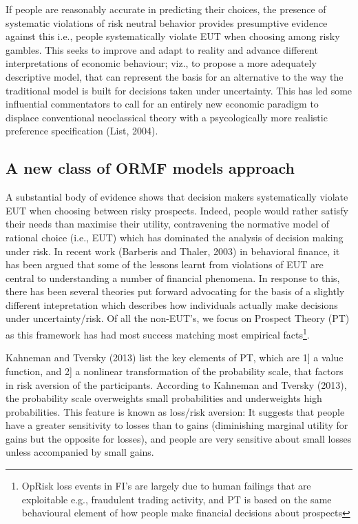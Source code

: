 \documentclass[]{DissertateUSU}
\let\rmarkdownfootnote\footnote%
\def\footnote{\protect\rmarkdownfootnote}
\begin{document}
If people are reasonably accurate in predicting their choices, the
presence of systematic violations of risk neutral behavior provides
presumptive evidence against this i.e., people systematically violate
EUT when choosing among risky gambles. This seeks to improve and adapt
to reality and advance different interpretations of economic behaviour;
viz., to propose a more adequately descriptive model, that can represent
the basis for an alternative to the way the traditional model is built
for decisions taken under uncertainty. This has led some influential
commentators to call for an entirely new economic paradigm to displace
conventional neoclassical theory with a psycologically more realistic
preference specification (List, 2004).

\subsection{A new class of ORMF models approach}

A substantial body of evidence shows that decision makers systematically
violate EUT when choosing between risky prospects. Indeed, people would
rather satisfy their needs than maximise their utility, contravening the
normative model of rational choice (i.e., EUT) which has dominated the
analysis of decision making under risk. In recent work (Barberis and
Thaler, 2003) in behavioral finance, it has been argued that some of the
lessons learnt from violations of EUT are central to understanding a
number of financial phenomena. In response to this, there has been
several theories put forward advocating for the basis of a slightly
different intepretation which describes how individuals actually make
decisions under uncertainty/risk. Of all the non-EUT's, we focus on
Prospect Theory (PT) as this framework has had most success matching
most empirical
facts\footnote{OpRisk loss events in FI's are largely due to human failings that are exploitable e.g., fraudulent trading activity, and PT is based on the same behavioural element of how people make financial decisions about prospects}.\medskip 

Kahneman and Tversky (2013) list the key elements of PT, which are 1{]}
a value function, and 2{]} a nonlinear transformation of the probability
scale, that factors in risk aversion of the participants. According to
Kahneman and Tversky (2013), the probability scale overweights small
probabilities and underweights high probabilities. This feature is known
as loss/risk aversion: It suggests that people have a greater
sensitivity to losses than to gains (diminishing marginal utility for
gains but the opposite for losses), and people are very sensitive about
small losses unless accompanied by small gains.\medskip 
\end{document}
